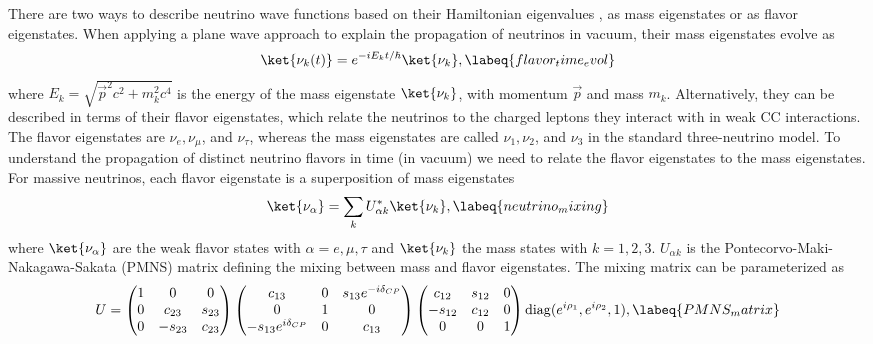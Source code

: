 There are two ways to describe neutrino wave functions based on their Hamiltonian eigenvalues , as mass eigenstates or as flavor eigenstates.
When applying a plane wave approach to explain the propagation of neutrinos in vacuum, their mass eigenstates evolve as
\begin{equation}
    \ket{\nu_k(t)} = e^{-iE_kt/\hbar}\ket{\nu_k},
    \labeq{flavor_time_evol}
\end{equation}
where $E_k=\sqrt{\vec{p}^2c^2+m_k^2c^4}$ is the energy of the mass eigenstate $\ket{\nu_k}$, with momentum $\vec{p}$ and mass $m_k$.
Alternatively, they can be described in terms of their flavor eigenstates, which relate the neutrinos to the charged leptons they interact with in weak CC interactions.
The flavor eigenstates are $\nu_e, \nu_\mu$, and $\nu_\tau$, whereas the mass eigenstates are called $\nu_1, \nu_2$, and $\nu_3$ in the standard three-neutrino model.
To understand the propagation of distinct neutrino flavors in time (in vacuum) we need to relate the flavor eigenstates to the mass eigenstates.
For massive neutrinos, each flavor eigenstate is a superposition of mass eigenstates 
\begin{equation}
    \ket{\nu_\alpha} = \sum_kU^*_{\alpha k}\ket{\nu_k},
    \labeq{neutrino_mixing}
\end{equation}
where $\ket{\nu_\alpha}$ are the weak flavor states with $\alpha=e,\mu,\tau$ and $\ket{\nu_k}$ the mass states with $k=1,2,3$.
$U_{\alpha k}$ is the Pontecorvo-Maki-Nakagawa-Sakata (PMNS) matrix defining the mixing between mass and flavor eigenstates.
The mixing matrix can be parameterized as 
\begin{equation}
    U=\left( 
    \begin{matrix}
        1 & 0 & 0 \\
        0 & c_{23}  & s_{23} \\
        0 & -s_{23} & c_{23} 
    \end{matrix}
    \right) 
    \left( 
    \begin{matrix}
        c_{13} & 0 & s_{13}e^{-i\delta_{CP}} \\
        0 & 1 & 0\\
        -s_{13} e^{i\delta_{CP}} & 0 & c_{13}
    \end{matrix}
    \right) 
    \left( 
    \begin{matrix}
        c_{12} & s_{12} & 0 \\
        -s_{12} & c_{12} & 0\\
        0 & 0 & 1
    \end{matrix} 
    \right)  
    \operatorname{diag}(e^{i\rho_{1}},e^{i\rho_{2}},1),
    \labeq{PMNS_matrix}
\end{equation}
